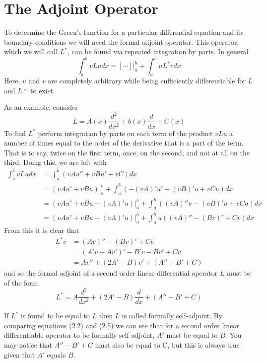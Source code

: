\section{The Adjoint Operator}
To determine the Green's function for a particular differential equation and its boundary conditions we will need the formal adjoint operator. This operator, which we will call \(L^*\), can be found via repeated integration by parts. In general
\begin{equation}
	\int_a^b vLu dx = [\cdots]\biggr\rvert_a^b + \int_a^b uL^*v dx
\end{equation}
Here, \(u\) and \(v\) are completely arbitrary while being sufficiently differentiable for \(L\) and \(L*\) to exist. 

As an example, consider
\begin{equation}
	L= A(x) \frac{d^2}{dx^2} + b(x)\frac{d}{dx} + C(x)
\end{equation}
To find \(L^*\) perform integration by parts on each term of the product \(vLu\) a number of times equal to the order of the derivative that is a part of the term. That is to say, twice on the first term, once, on the second, and not at all on the third. Doing this, we are left with
\begin{equation}
	\begin{split}
		\int_a^b vLu dx &= \int_a^b (vAu''+ vBu' + vC)dx\\
		&=(vAu'+vBu)\biggr\rvert_a^b + \int_a^b (-(vA)'u'-(vB)'u+vCu)dx\\
		&=(vAu'+vBu-(vA)'u)\biggr\rvert_a^b + \int_a^b ((vA)''u-(vB)'u+vCu)dx\\
		&=(vAu'+vBu-(vA)'u)\biggr\rvert_a^b + \int_a^b u((vA)''-(Bv)'+Cv)dx
	\end{split}
\end{equation}
From this it is clear that 
\begin{equation}
	\begin{split}
		L^*v &= (Av)''-(Bv)'+Cv\\
		     &= (A'v+Av')'-B'v-Bv'+Cv\\
		     &= Av''+(2A'-B)v'+(A''-B'+C)
	\end{split}
\end{equation}
and so the formal adjoint of a second order linear differential operator \(L\) must be of the form
\begin{equation}
	L^*=A\frac{d^2}{dx^2} + (2A'-B)\frac{d}{dx}+(A''-B'+C)
\end{equation}

If \(L^*\) is found to be equal to \(L\) then \(L\) is called formally self-adjoint. By comparing equations (2.2) and (2.5) we can see that for a second order linear differentiable operator to be formally self-adjoint, \(A'\) must be equal to \(B\). You may notice that \(A''-B'+C\) must also be equal to C, but this is always true given that \(A'\) equals \(B\).

